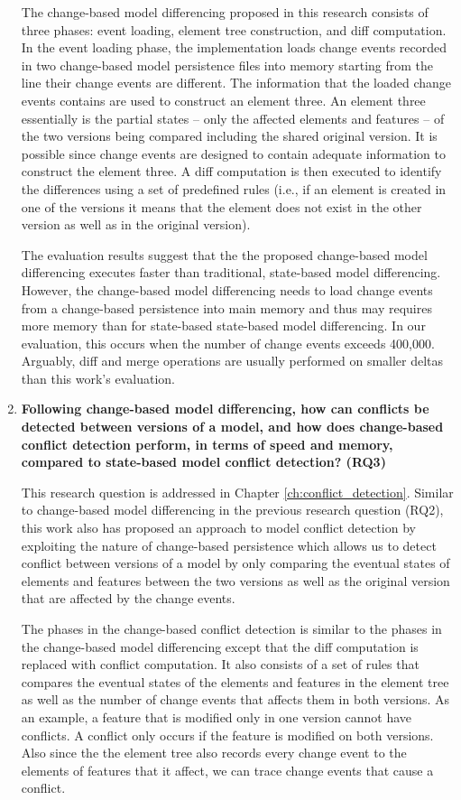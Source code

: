 \begin{enumerate}
 The change-based model differencing proposed in this research consists of three phases: event loading, element tree construction, and diff computation. In the event loading phase, the implementation loads change events recorded in two change-based model persistence files into memory starting from the line their change events are different. The information that the loaded change events contains are used to construct an element three. An element three essentially is the partial states -- only the affected elements and features -- of the two versions being compared including the shared original version. It is possible since change events are designed to contain adequate information to construct the element three. A diff computation is then executed to identify the differences using a set of predefined rules (i.e., if an element is created in one of the versions it means that the element does not exist in the other version as well as in the original version).
 
 The evaluation results suggest that the the proposed change-based model differencing executes faster than traditional, state-based model differencing.
 However, the change-based model differencing needs to load change events from a change-based persistence into main memory and thus may requires more memory than for state-based state-based model differencing. In our evaluation, this occurs when the number of change events exceeds 400,000. Arguably, diff and merge operations are usually performed on smaller deltas than this work's evaluation.
  
  \item \textbf{Following change-based model differencing, how can conflicts be detected between versions of a model, and  how does change-based conflict detection perform, in terms of speed and memory, compared to state-based model conflict detection? (RQ3)} 
  
  This research question is addressed in Chapter \ref{ch:conflict_detection}.  Similar to change-based model differencing in the previous research question (RQ2), this work also has proposed an approach to model conflict detection by exploiting the nature of change-based persistence which allows us to detect conflict between versions of a model by only comparing the eventual states of elements and features between the two versions as well as the original version that are affected by the change events.
  
  The phases in the change-based conflict detection is similar to the phases in the change-based model differencing except that the diff computation is replaced with conflict computation. It also consists of a set of rules that compares the eventual states of the elements and features in the element tree as well as the number of change events that affects them in both versions. As an example, a feature that is modified only in one version cannot have conflicts. A conflict only occurs if the feature is modified on both versions. Also since the the element tree also records every change event to the elements of features that it affect, we can trace change events that cause a conflict.
  

\end{enumerate}
